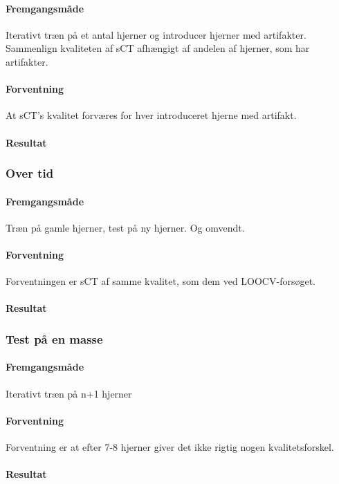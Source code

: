 \paragraph{Fremgangsmåde}
Iterativt træn på et antal hjerner og introducer hjerner med artifakter.
Sammenlign kvaliteten af sCT afhængigt af andelen af hjerner, som har
artifakter.

\paragraph{Forventning}
At sCT's kvalitet forværes for hver introduceret hjerne med artifakt.

\paragraph{Resultat}


\subsubsection{Over tid}
\paragraph{Fremgangsmåde}
Træn på gamle hjerner, test på ny hjerner. Og omvendt.

\paragraph{Forventning}
Forventningen er sCT af samme kvalitet, som dem ved LOOCV-forsøget.

\paragraph{Resultat}

\subsubsection{Test på en masse}
\paragraph{Fremgangsmåde}
Iterativt træn på n+1 hjerner

\paragraph{Forventning}
Forventning er at efter 7-8 hjerner giver det ikke rigtig nogen
kvalitetsforskel.

\paragraph{Resultat}